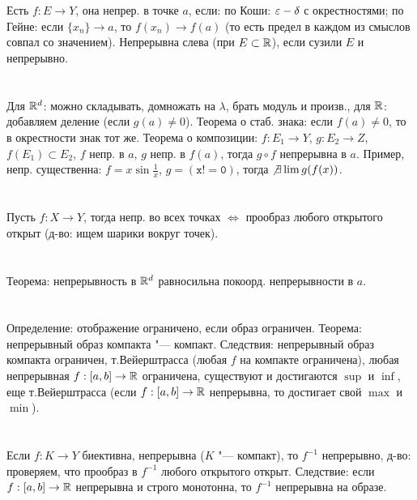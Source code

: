\section{} %
Есть $f: E \to Y$, она непрер. в точке $a$, если: по Коши: $\varepsilon-\delta$
с окрестностями; по Гейне: если $\{x_n\}\to a$, то $f(x_n) \to f(a)$
(то есть предел в каждом из смыслов совпал со значением). Непрерывна
слева (при $E \subset \mathbb{R}$), если сузили $E$ и непрерывно.

\pagebreak
\section{} %
Для $\mathbb{R}^d$: можно складывать, домножать на $\lambda$, брать модуль и произв.,
для $\mathbb{R}$: добавляем деление (если $g(a)\neq 0$).
Теорема о стаб. знака: если $f(a)\neq 0$, то в окрестности знак тот же.
Теорема о композиции: $f: E_1 \to Y$, $g: E_2 \to Z$, $f(E_1)\subset E_2$,
$f$ непр. в $a$, $g$ непр. в $f(a)$, тогда $g\circ f$ непрерывна в $a$.
Пример, непр. существенна: $f=x\sin \frac1x$, $g=(\mathtt{x!=0})$, тогда $\not\exists \lim g(f(x))$.

\section{} %
Пусть $f: X \to Y$, тогда непр. во всех точках $\iff$ прообраз любого открытого открыт
(д-во: ищем шарики вокруг точек).

\section{} %
Теорема: непрерывность в $\mathbb{R}^d$ равносильна покоорд. непрерывности в $a$.

\section{} %
Определение: отображение ограничено, если образ ограничен.
Теорема: непрерывный образ компакта "--- компакт.
Следствия: непрерывный образ компакта ограничен, т.Вейерштрасса
(любая $f$ на компакте ограничена), любая непрерывная $f: [a, b] \to \mathbb{R}$
ограничена, существуют и достигаются $\sup$ и $\inf$, еще т.Вейерштрасса
(если $f: [a,b]\to\mathbb{R}$ непрерывна, то достигает свой $\max$ и $\min$).

\section{} %
Если $f: K \to Y$ биективна, непрерывна ($K$ "--- компакт), то $f^{-1}$ непрерывно,
д-во: проверяем, что прообраз в $f^{-1}$ любого открытого открыт.
Следствие: если $f: [a,b]\to\mathbb{R}$ непрерывна и строго монотонна, то
$f^{-1}$ непрерывна на образе.

